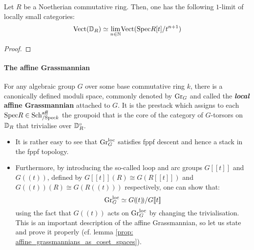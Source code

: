                     \begin{lemma} \label{lemma: vector_bundles_on_the_formal_disc}
                        Let $R$ be a Noetherian commutative ring. Then, one has the following $1$-limit of locally small categories:
                            $$\mathrm{Vect}(\mathbb{D}_R) \simeq \underset{n \in \mathbb{N}}{\operatorname{lim}} \mathrm{Vect}(\mathrm{Spec} R[t]/t^{n + 1})$$
                    \end{lemma}
                        \begin{proof}
                            
                        \end{proof}
                
                \paragraph{The affine Grassmannian}
                    \begin{definition} \label{def: local_affine_grassmannians}
                        For any algebraic group $G$ over some base commutative ring $k$, there is a canonically defined moduli space, commonly denoted by $\mathrm{Gr}_G$ and called the \textbf{\textit{local} affine Grassmannian} attached to $G$. It is the prestack which assigns to each $\mathrm{Spec} R \in \mathrm{Sch}_{/\mathrm{Spec} k}^{\mathrm{aff}}$ the groupoid that is the core of the category of $G$-torsors on $\mathbb{D}_R$ that trivialise over $\mathbb{D}_R^{\circ}$.  
                    \end{definition}
                    \begin{remark}
                        \noindent
                        \begin{itemize}
                            \item It is rather easy to see that $\mathrm{Gr}_G^{\mathrm{loc}}$ satisfies fppf descent and hence a stack in the fppf topology.
                            \item Furthermore, by introducing the so-called loop and arc groups $G[\![t]\!]$ and $G(\!(t)\!)$, defined by $G[\![t]\!](R) \cong G(R[\![t]\!])$ and $G(\!(t)\!)(R) \cong G(R(\!(t)\!))$ respectively, one can show that:
                                $$\mathrm{Gr}_G^{\mathrm{loc}} \simeq G(\!(t)\!)/G[\![t]\!]$$
                            using the fact that $G(\!(t)\!)$ acts on $\mathrm{Gr}_G^{\mathrm{loc}}$ by changing the trivialisation. This is an important description of the affine Grassmannian, so let us state and prove it properly (cf. lemma \ref{prop: affine_grassmannians_as_coset_spaces}).
                        \end{itemize}
                    \end{remark}
                    
